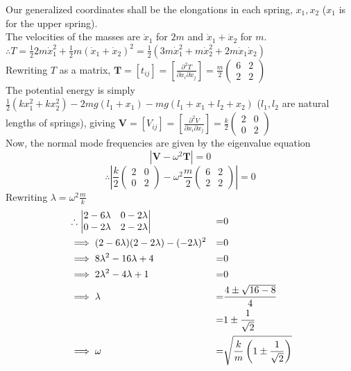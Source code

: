 \documentclass[12pt]{article}
\begin{document}
Our generalized coordinates shall be the elongations in each spring, $x_1,x_2$ ($x_1$ is for the upper spring).\\
The velocities of the masses are $\dot x_1$ for $2m$ and $\dot x_1 +\dot x_2$ for $m$.\\
$\therefore T=\frac12 2m \dot x_1^2 + \frac12 m (\dot x_1+\dot x_2)^2=\frac12(3m\dot x_1^2 + m\dot x_2^2+2m\dot x_1\dot x_2)$\\
Rewriting $T$ as a matrix, $\mathbf T=[t_{ij}]=\left[\frac{\partial^2 T}{\partial \dot x_i\partial \dot x_j}\right]=\frac{m}2\begin{pmatrix}
6 & 2\\
2 &2
\end{pmatrix}$\\
The potential energy is simply $\frac12(kx_1^2+kx_2^2)-2mg(l_1+x_1)-mg(l_1+x_1+l_2+x_2)$ ($l_1,l_2$ are natural lengths of springs), giving $\mathbf V=[V_{ij}]=\left[\frac{\partial^2 V}{\partial x_i\partial x_j}\right]=\frac{k}2\begin{pmatrix}
2 & 0\\
0 &2
\end{pmatrix}$\\
Now, the normal mode frequencies are given by the eigenvalue equation $$|\mathbf V-\omega^2\mathbf T|=0$$
$$\therefore\left| \frac{k}2\begin{pmatrix}
2 & 0\\
0 &2
\end{pmatrix}-\omega^2\frac{m}2\begin{pmatrix}
6 & 2\\
2 &2
\end{pmatrix}\right|=0$$
Rewriting $\lambda=\omega^2\frac{m}{k}$
\begin{align}
&\therefore \begin{vmatrix}
2 -6\lambda & 0-2\lambda\\
0-2\lambda &2-2\lambda
\end{vmatrix} &=& 0\notag \\
&\implies (2-6\lambda)(2-2\lambda)-(-2\lambda)^2 &=& 0\notag\\
&\implies  8\lambda^2 -16\lambda +4 &=& 0\notag\\
&\implies  2\lambda^2 -4\lambda +1 &=& 0\notag\\
&\implies \lambda &=& \frac{4\pm\sqrt{16-8}}{4}\notag\\
&~ &=& 1\pm\frac1{\sqrt{2}}\notag\\
&\implies \omega &=&\sqrt{\frac{k}{m}\left(1\pm\frac1{\sqrt{2}}\right)}\notag
\end{align}
\end{document}
